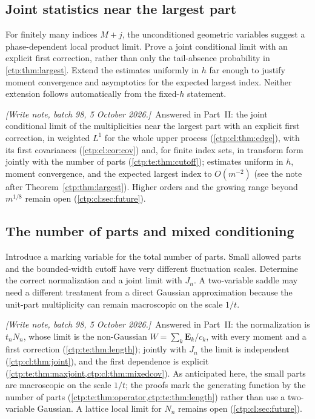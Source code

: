 \documentclass[11pt,a4paper]{article}
\numberwithin{equation}{section}
\theoremstyle{definition}
\theoremstyle{remark}
\newcommand{\writenoteB}[1]{\par\smallskip\noindent
 \textit{[Write note, batch 98, 5 October 2026.]}\ #1\par\smallskip}
\begin{document}
\subsection{Joint statistics near the largest part}
For finitely many indices $M+j$, the unconditioned geometric variables
suggest a phase-dependent local product limit. Prove a joint conditional
limit with an explicit first correction, rather than only the tail-absence
probability in \cref{ctp:thm:largest}. Extend the estimates uniformly in $h$
far enough to justify moment convergence and asymptotics for the expected
largest index. Neither extension follows automatically from the fixed-$h$
statement.

\writenoteB{Answered in Part~II: the joint conditional limit of the
multiplicities near the largest part with an explicit first correction, in
weighted $L^1$ for the whole upper process (\cref{ctp:cl:thm:edge}), with its
first covariances (\cref{ctp:cl:cor:cov}) and, for finite index sets, in
transform form jointly with the number of parts (\cref{ctp:te:thm:cutoff});
estimates uniform in $h$, moment convergence, and the expected largest index
to $O(m^{-2})$ (see the note after Theorem~\ref{ctp:thm:largest}). Higher
orders and the growing range beyond $m^{1/8}$ remain open
(\cref{ctp:cl:sec:future}).}

\subsection{The number of parts and mixed conditioning}
Introduce a marking variable for the total number of parts. Small allowed
parts and the bounded-width cutoff have very different fluctuation scales.
Determine the correct normalization and a joint limit with $J_n$.
A two-variable saddle may need a different treatment from a direct
Gaussian approximation because the unit-part multiplicity can remain
macroscopic on the scale $1/t$.

\writenoteB{Answered in Part~II: the normalization is $t_nN_n$, whose limit
is the non-Gaussian $W=\sum_k\mathbf E_k/c_k$, with every moment and a first
correction (\cref{ctp:te:thm:length}); jointly with $J_n$ the limit is
independent (\cref{ctp:cl:thm:joint}), and the first dependence is explicit
(\cref{ctp:te:thm:maxjoint,ctp:cl:thm:mixedcov}). As anticipated here, the
small parts are macroscopic on the scale $1/t$; the proofs mark the
generating function by the number of parts
(\cref{ctp:te:thm:operator,ctp:te:thm:length}) rather than use a
two-variable Gaussian. A lattice local limit for $N_n$ remains open
(\cref{ctp:cl:sec:future}).}
\end{document}

